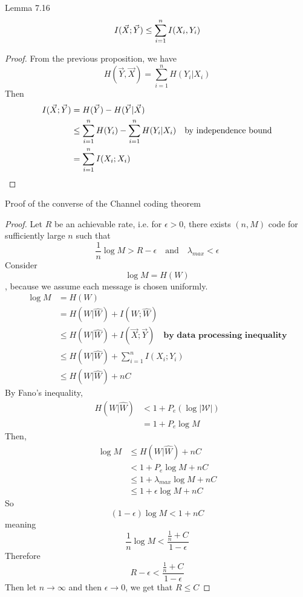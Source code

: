 \documentclass[../main.tex]{subfiles}
\begin{document}
\begin{bbox}{Lemma 7.16}
    \[I(\vec X;\vec Y)\leq \sum_{i=1}^nI(X_i,Y_i)
    \]
    
    \begin{proof}
        From the previous proposition, we have \[
        H(\vec Y,\vec X)=\sum_{i=1}^nH(Y_i|X_i)
        \]
        Then
        \begin{align*} 
        I(\vec X;\vec Y) &= H(\vec Y) - H(\vec Y | \vec X) \\
        &\leq \sum_{i=1}^nH(Y_i)-\sum_{i=1}^nH(Y_i|X_i) \quad\text{by independence bound}\\
        &=\sum_{i=1}^n I(X_i;X_i)
        \end{align*}
    \end{proof}
\end{bbox}
\begin{bbox}{Proof of the converse of the Channel coding theorem}
    \begin{proof}
        Let $R$ be an achievable rate, i.e. for $\epsilon>0$, there exists $(n,M)$ code for sufficiently large $n$ such that \[
        \frac{1}{n}\log M > R-\epsilon \quad \text{and}\quad \lambda_{max}<\epsilon
        \]
        Consider \[
        \log M=H(W)
        \], because we assume each message is chosen uniformly.
        \begin{align*}
            \log M &= H(W)\\
            &= H(W|\hat{W}) + I(W;\hat{W})\\
            &\leq H(W|\hat{W})+I(\vec X;\vec Y) \quad \textbf{by data processing inequality}\\
            &\leq H(W|\hat{W})+\sum_{i=1}^nI(X_i;Y_i)\\
            &\leq H(W|\hat{W})+nC
        \end{align*}
    By Fano's inequality, \begin{align*}
        H(W|\hat{W})&< 1+P_e(\log |\mathcal{W}|)\\
        &= 1 + P_e\log M
    \end{align*}
    Then, \begin{align*}
        \log M &\leq H(W|\hat{W})+nC\\
        &< 1 + P_e\log M + nC\\
        &\leq 1 + \lambda_{max}\log M + nC\\
        &\leq 1+ \epsilon\log M + nC
    \end{align*}
    So \[
    (1-\epsilon)\log M < 1+nC
    \]
    meaning \[
    \frac{1}{n}\log M < \frac{\frac{1}{n}+C}{1-\epsilon}
    \]
    Therefore \[
    R-\epsilon < \frac{\frac{1}{n}+C}{1-\epsilon}
    \]
    Then let $n\to \infty$ and then $\epsilon \to 0$, we get that $R\leq C$
    \end{proof}
\end{bbox}
\end{document}
